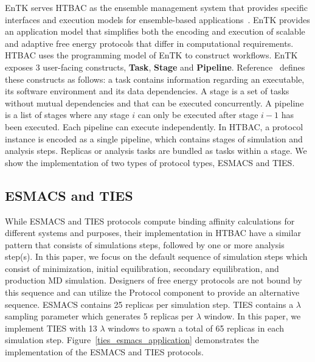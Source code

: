 EnTK serves HTBAC as the ensemble management system that provides specific 
interfaces and execution models for ensemble-based 
applications~\cite{power-of-many17}. EnTK provides an application model that 
simplifies both the encoding and execution of scalable and adaptive free energy 
protocols that differ in computational requirements. HTBAC uses the programming 
model of EnTK to construct workflows. EnTK exposes 3 
user-facing constructs, \textbf{Task}, \textbf{Stage} and \textbf{Pipeline}. 
Reference~\cite{power-of-many17} defines these constructs as follows: a task 
contains information regarding an executable, its software environment and its 
data dependencies. A stage is a set of tasks without mutual dependencies and 
that can be executed concurrently. A pipeline is a list of stages where any 
stage $i$ can only be executed after stage $i - 1$ has been executed. Each 
pipeline can execute independently. In HTBAC, a protocol instance is encoded as 
a single pipeline, which contains stages of simulation and analysis steps. 
Replicas or analysis tasks are bundled as tasks within a stage. We show the 
implementation of two types of protocol types, ESMACS and TIES.

\subsection{ESMACS and TIES}

While ESMACS and TIES protocols compute binding affinity calculations for 
different systems and purposes, their implementation in HTBAC have a similar 
pattern that consists of simulations steps, followed by one or more analysis 
step(s). In this paper, we focus on the default sequence of simulation steps 
which consist of minimization, initial equilibration, secondary equilibration, 
and production MD simulation. Designers of free energy protocols are not bound 
by this sequence and can utilize the Protocol component to provide an
alternative sequence. ESMACS contains 25 replicas per simulation step. TIES 
contains a $\lambda$ sampling parameter which generates 5 replicas per 
$\lambda$ window. In this paper, we implement TIES with 13 $\lambda$ windows to 
spawn a total of 65 replicas in each simulation step. 
Figure~\ref{ties_esmacs_application} demonstrates the implementation of the 
ESMACS and TIES protocols. 

